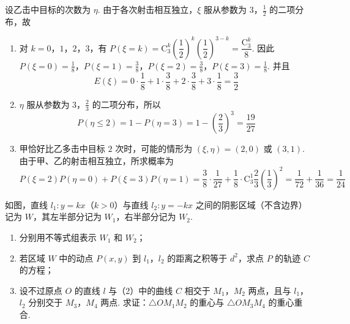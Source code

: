 \begin{solution}
设乙击中目标的次数为 \(\eta\). 由于各次射击相互独立，\(\xi\) 服从参数为 \(3\)，\(\frac{1}{2}\) 的二项分布，故
\begin{enumerate}
\item 对 \(k=0\)，\(1\)，\(2\)，\(3\)，有 \(P(\xi=k)=\mathrm C_3^k\left(\dfrac{1}{2}\right)^k\left(\dfrac{1}{2}\right)^{3-k}=\dfrac{\mathrm C_3^k}{8}\). 因此
\(P(\xi=0)=\frac18\)，\(P(\xi=1)=\frac38\)，\(P(\xi=2)=\frac38\)，\(P(\xi=3)=\frac18\).
并且
\[
E(\xi)=0\cdot\frac18+1\cdot\frac38+2\cdot\frac38+3\cdot\frac18=\frac32
\]

\item \(\eta\) 服从参数为 \(3\)，\(\frac23\) 的二项分布，所以
\[
P(\eta\leqslant2)=1-P(\eta=3)=1-\left(\frac23\right)^3=\frac{19}{27}
\]

\item 甲恰好比乙多击中目标 \(2\) 次时，可能的情形为 \((\xi,\eta)=(2,0)\) 或 \((3,1)\). 由于甲、乙的射击相互独立，所求概率为
\[
P(\xi=2)P(\eta=0)+P(\xi=3)P(\eta=1)
=\frac38\cdot\frac1{27}+\frac18\cdot\mathrm C_3^1\frac23\left(\frac13\right)^2
=\frac1{72}+\frac1{36}=\frac1{24}
\]
\end{enumerate}
\end{solution}

\begin{problem}
如图，直线 \(l_1:y=kx\)（\(k>0\)）与直线 \(l_2:y=-kx\) 之间的阴影区域（不含边界）记为 \(W\)，其左半部分记为 \(W_1\)，右半部分记为 \(W_2\).

\begin{enumerate}
\item 分别用不等式组表示 \(W_1\) 和 \(W_2\)；
\item 若区域 \(W\) 中的动点 \(P(x,y)\) 到 \(l_1\)，\(l_2\) 的距离之积等于 \(d^2\)，求点 \(P\) 的轨迹 \(C\) 的方程；
\item 设不过原点 \(O\) 的直线 \(l\) 与（2）中的曲线 \(C\) 相交于 \(M_1\)，\(M_2\) 两点，且与 \(l_1\)，\(l_2\) 分别交于 \(M_3\)，\(M_4\) 两点. 求证：\(\triangle OM_1M_2\) 的重心与 \(\triangle OM_3M_4\) 的重心重合.
\end{enumerate}

\end{problem}

